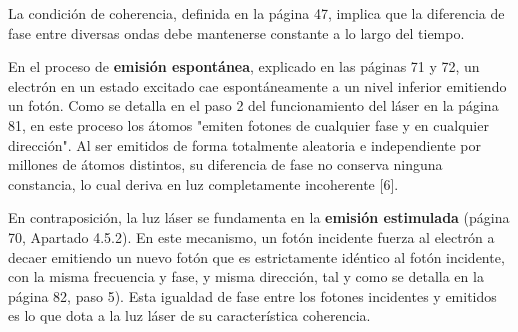 \documentclass[11pt, a4paper]{article}
\newenvironment{problem}[1][Cuestión]{
	\vspace{0.5cm}
	\noindent{\Large\bfseries #1} \par\vspace{0.5cm}
}{
	\vspace{0.5cm}
}
\begin{document}
\begin{problem}[Cuestión 6]
\begin{enumerate}[label=\alph*)]
				{ \color{blue} 
					La condición de coherencia, definida en la página 47, implica que la diferencia de fase entre diversas ondas debe mantenerse constante a lo largo del tiempo. 

					En el proceso de \textbf{emisión espontánea}, explicado en las páginas 71 y 72, un electrón en un estado excitado cae espontáneamente a un nivel inferior emitiendo un fotón. Como se detalla en el paso 2 del funcionamiento del láser en la página 81, en este proceso los átomos "emiten fotones de cualquier fase y en cualquier dirección". Al ser emitidos de forma totalmente aleatoria e independiente por millones de átomos distintos, su diferencia de fase no conserva ninguna constancia, lo cual deriva en luz completamente incoherente [6].

					En contraposición, la luz láser se fundamenta en la \textbf{emisión estimulada} (página 70, Apartado 4.5.2). En este mecanismo, un fotón incidente fuerza al electrón a decaer emitiendo un nuevo fotón que es estrictamente idéntico al fotón incidente, con la misma frecuencia y fase, y misma dirección, tal y como se detalla en la página 82, paso 5). Esta igualdad de fase entre los fotones incidentes y emitidos es lo que dota a la luz láser de su característica coherencia.
				}
		\end{enumerate}
	\end{problem}
\end{document}
